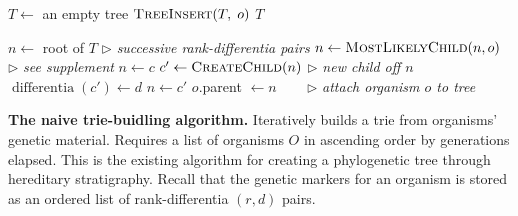 \begin{algorithm}[h]
    \begin{algorithmic}[1]
    \small{
            \State $T \gets$ an empty tree
                \State $\textsc{TreeInsert}(T,\; o)$
            \EndFor
            \State \Return $T$
        \EndFunction

            \State $n \gets$ root of $T$
             \text{ } $\triangleright$ \textit{successive rank-differentia pairs}
                \State $n \gets \textsc{MostLikelyChild}(n, o)$ \text{ } $\triangleright$ \textit{see supplement}
                    \State $n \gets c$
                \Else 
                    \State $c' \gets \textsc{CreateChild}(n)$ \text{ } $\triangleright$ \textit{new child off $n$} 
                    \State $\operatorname{differentia}(c') \gets d$
                    \State $n \gets c'$
                \EndIf
            \EndFor
            \State $o$.parent $\gets n$ ~~~ $\triangleright$ \textit{attach organism $o$ to tree}
        \EndFunction
    }
    \end{algorithmic}
    \caption{\textbf{The naive trie-buidling algorithm.} \small Iteratively builds a trie from organisms' genetic material. Requires a list of organisms $O$ in ascending order by generations elapsed. This is the existing algorithm for creating a phylogenetic tree through hereditary stratigraphy. Recall that the genetic markers for an organism is stored as an ordered list of rank-differentia $(r, d)$ pairs. \vspace{-1.5em}}
    \label{alg:old}
\end{algorithm}
